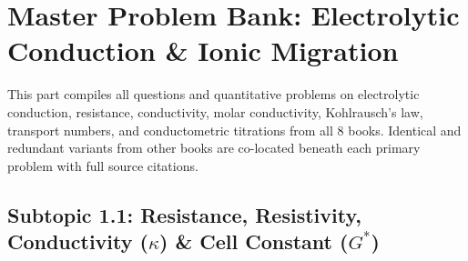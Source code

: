 \chapter{Master Problem Bank: Electrolytic Conduction \& Ionic Migration}
\label{chap:qb_conduction}

\begin{tcolorbox}[enhanced,colback=subtlegreen,colframe=cengagegreen,arc=2mm,boxrule=1pt,
    title=\textbf{\large Part I Organization: Electrolytic Conduction, Kohlrausch \& Transport Numbers}]
This part compiles all questions and quantitative problems on electrolytic conduction, resistance, conductivity, molar conductivity, Kohlrausch's law, transport numbers, and conductometric titrations from all 8 books. Identical and redundant variants from other books are co-located beneath each primary problem with full source citations.
\end{tcolorbox}

\section{Subtopic 1.1: Resistance, Resistivity, Conductivity ($\kappa$) \& Cell Constant ($G^*$)}

